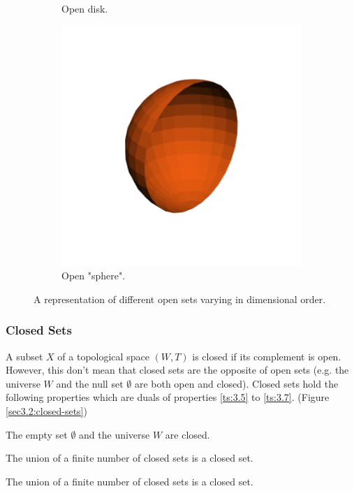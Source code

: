 \documentclass[a4paper,11pt,oneside]{article}
\begin{document}
\begin{figure}[ht]
\begin{subfigure}[b]{0.3\textwidth}
         \caption{Open disk.}
     \end{subfigure}
     \hfill
     \begin{subfigure}[b]{0.3\textwidth}
         \centering
         \includegraphics[width=\textwidth]{section3/3.2/open-sphere.png}
         \caption{Open "sphere".}
     \end{subfigure}
     \hfill
        \caption{A representation of different open sets varying in dimensional order.}
        \label{sec3.2:open-sets}
\end{figure}

   
    
\subsubsection{Closed Sets}
\begin{definition}
	A subset $X$ of a topological space $(W, T)$ is closed if its complement is open. However, this don't mean that closed sets are the opposite of open sets (e.g. the universe $W$ and the null set $\emptyset$ are both open and closed). Closed sets hold the following properties which are duals of properties \eqref{ts:3.5} to \eqref{ts:3.7}. (Figure \ref{sec3.2:closed-sets})
		    
	\begin{property}
		The empty set $\emptyset$ and the universe $W$ are closed. \cite{mansfield_1987}
	\end{property}
	\begin{property}
		The union of a finite number of closed sets is a closed set. \cite{mansfield_1987}
	\end{property}
	\begin{property}
		The union of a finite number of closed sets is a closed set. \cite{mansfield_1987}
	\end{property}
\end{definition}
    
\end{document}
